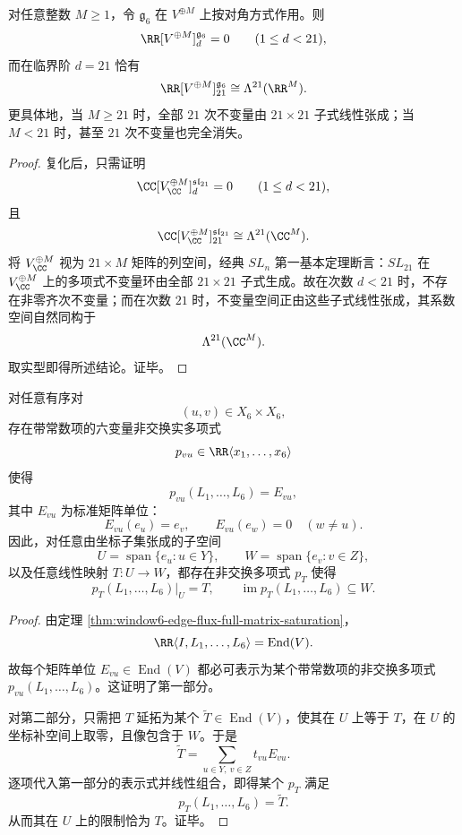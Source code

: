 \begin{theorem}\label{thm:conclusion-window6-degree21-plucker-first-invariants}
对任意整数 \(M\ge 1\)，令 \(\mathfrak g_6\) 在 \(V^{\oplus M}\) 上按对角方式作用。则
\[
\RR[V^{\oplus M}]^{\mathfrak g_6}_d=0
\qquad
(1\le d<21),
\]
而在临界阶 \(d=21\) 恰有
\[
\RR[V^{\oplus M}]^{\mathfrak g_6}_{21}
\cong
\Lambda^{21}(\RR^M).
\]
更具体地，当 \(M\ge 21\) 时，全部 \(21\) 次不变量由 \(21\times 21\) 子式线性张成；当 \(M<21\) 时，甚至 \(21\) 次不变量也完全消失。
\end{theorem}
\begin{proof}
复化后，只需证明
\[
\CC[V_{\CC}^{\oplus M}]^{\mathfrak{sl}_{21}}_d=0
\qquad
(1\le d<21),
\]
且
\[
\CC[V_{\CC}^{\oplus M}]^{\mathfrak{sl}_{21}}_{21}
\cong
\Lambda^{21}(\CC^M).
\]
将 \(V_{\CC}^{\oplus M}\) 视为 \(21\times M\) 矩阵的列空间，经典 \(SL_n\) 第一基本定理断言：\(SL_{21}\) 在 \(V_{\CC}^{\oplus M}\) 上的多项式不变量环由全部 \(21\times 21\) 子式生成。故在次数 \(d<21\) 时，不存在非零齐次不变量；而在次数 \(21\) 时，不变量空间正由这些子式线性张成，其系数空间自然同构于
\[
\Lambda^{21}(\CC^M).
\]
取实型即得所述结论。证毕。
\end{proof}

\begin{theorem}\label{thm:conclusion-window6-rankone-routing-completeness}
对任意有序对
\[
(u,v)\in X_6\times X_6,
\]
存在带常数项的六变量非交换实多项式
\[
p_{vu}\in \RR\langle x_1,\dots,x_6\rangle
\]
使得
\[
p_{vu}(L_1,\dots,L_6)=E_{vu},
\]
其中 \(E_{vu}\) 为标准矩阵单位：
\[
E_{vu}(e_u)=e_v,
\qquad
E_{vu}(e_w)=0\quad (w\neq u).
\]
因此，对任意由坐标子集张成的子空间
\[
U=\operatorname{span}\{e_u:u\in Y\},
\qquad
W=\operatorname{span}\{e_v:v\in Z\},
\]
以及任意线性映射 \(T:U\to W\)，都存在非交换多项式 \(p_T\) 使得
\[
p_T(L_1,\dots,L_6)|_U=T,
\qquad
\operatorname{im}p_T(L_1,\dots,L_6)\subseteq W.
\]
\end{theorem}
\begin{proof}
由定理 \ref{thm:window6-edge-flux-full-matrix-saturation}，
\[
\RR\langle I,L_1,\dots,L_6\rangle=\operatorname{End}(V).
\]
故每个矩阵单位 \(E_{vu}\in \operatorname{End}(V)\) 都必可表示为某个带常数项的非交换多项式 \(p_{vu}(L_1,\dots,L_6)\)。这证明了第一部分。

对第二部分，只需把 \(T\) 延拓为某个 \(\widetilde T\in \operatorname{End}(V)\)，使其在 \(U\) 上等于 \(T\)，在 \(U\) 的坐标补空间上取零，且像包含于 \(W\)。于是
\[
\widetilde T=\sum_{u\in Y,\ v\in Z}t_{vu}E_{vu}.
\]
逐项代入第一部分的表示式并线性组合，即得某个 \(p_T\) 满足
\[
p_T(L_1,\dots,L_6)=\widetilde T.
\]
从而其在 \(U\) 上的限制恰为 \(T\)。证毕。
\end{proof}

